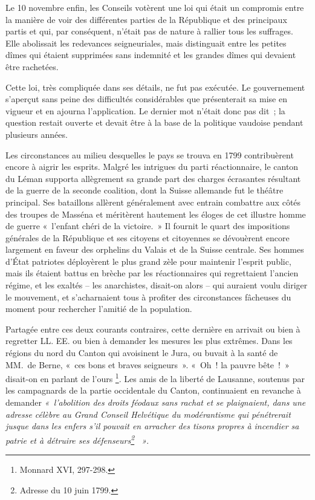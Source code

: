 \documentclass[french,twoside]{book} %
\begin{document}
\noindent Le 10 novembre enfin, les Conseils votèrent une loi qui était un compromis entre la manière de voir des différentes parties de la République et des principaux partis et qui, par conséquent, n’était pas de nature à rallier tous les suffrages. Elle abolissait les redevances seigneuriales, mais distinguait entre les petites dîmes qui étaient supprimées sans indemnité et les grandes dîmes qui devaient être rachetées.\par
Cette loi, très compliquée dans ses détails, ne fut pas exécutée. Le gouvernement s’aperçut sans peine des difficultés considérables que présenterait sa mise en vigueur et en ajourna l’application. Le dernier mot n’était donc pas dit ; la question restait ouverte et devait être à la base de la politique vaudoise pendant plusieurs années.\par
Les circonstances au milieu desquelles le pays se trouva en 1799 contribuèrent encore à aigrir les esprits. Malgré les intrigues du parti réactionnaire, le canton du Léman supporta allègrement sa grande part des charges écrasantes résultant de la guerre de la seconde coalition, dont la Suisse allemande fut le théâtre principal. Ses bataillons allèrent généralement avec entrain combattre aux côtés des troupes de Masséna et méritèrent hautement les éloges de cet illustre homme de guerre « l’enfant chéri de la victoire. » Il fournit le quart des impositions générales de la République et ses citoyens et citoyennes se dévouèrent encore largement en faveur des orphelins du Valais et de la Suisse centrale. Ses hommes d’État patriotes déployèrent le plus grand zèle pour maintenir l’esprit public, mais ils étaient battus en brèche par les réactionnaires qui regrettaient l’ancien régime, et les exaltés – les anarchistes, disait-on alors – qui auraient voulu diriger le mouvement, et s’acharnaient tous à profiter des circonstances fâcheuses du moment pour rechercher l’amitié de la population.\par
Partagée entre ces deux courants contraires, cette dernière en arrivait ou bien à regretter LL. EE. ou bien à demander les mesures les plus extrêmes. Dans les régions du nord du Canton qui avoisinent le Jura, ou buvait à la santé de MM. de Berne, « ces bons et braves seigneurs ». « Oh ! la pauvre bête ! » disait-on en parlant de l’ours \footnote{Monnard XVI, 297-298.}. Les amis de la liberté de Lausanne, soutenus par les campagnards de la partie occidentale du Canton, continuaient en revanche à demander \emph{« l’abolition des droits féodaux sans rachat et se plaignaient, dans une adresse célèbre au Grand Conseil Helvétique du modérantisme qui pénétrerait jusque dans les enfers s’il pouvait en arracher des tisons propres à incendier sa patrie et à détruire ses défenseurs\footnote{Adresse du 10 juin 1799.}  »}.
\end{document}
